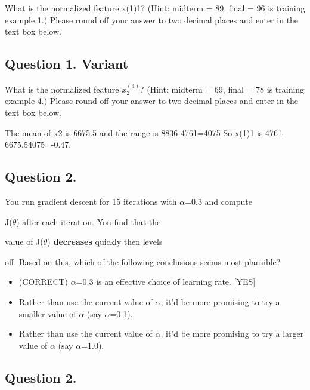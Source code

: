 \documentclass[11pt]{article} %
\begin{document}
	What is the normalized feature x(1)1? (Hint: midterm = 89, final = 96 is training example 1.) Please round off your answer to two decimal places and enter in the text box below.

	\subsection{Question 1. Variant} 	
	What is the normalized feature $x^{(4)}_2$? (Hint: midterm = 69, final = 78 is training example 4.) Please round off your answer to two decimal places and enter in the text box below.
	
	
The mean of x2 is 6675.5 and the range is 8836-4761=4075 So x(1)1 is 4761-6675.54075=-0.47.
	
	\subsection{Question 2.} 
	You run gradient descent for 15 iterations 	with $\alpha$=0.3 and compute
	
	J($\theta$) after each iteration. You find that the
	
	value of J($\theta$) \textbf{decreases} quickly then levels
	
	off. Based on this, which of the following conclusions seems most plausible?
	
	
\begin{itemize}
	\item (CORRECT)	$\alpha$=0.3 is an effective choice of learning rate.  [YES]
	
	\item Rather than use the current value of $\alpha$, it'd be more promising to try a smaller value of $\alpha$ (say $\alpha$=0.1).
	
	\item Rather than use the current value of $\alpha$, it'd be more promising to try a larger value of $\alpha$ (say $\alpha$=1.0).
\end{itemize}	

	
	
	\subsection{Question 2.} 
		
\end{document}
